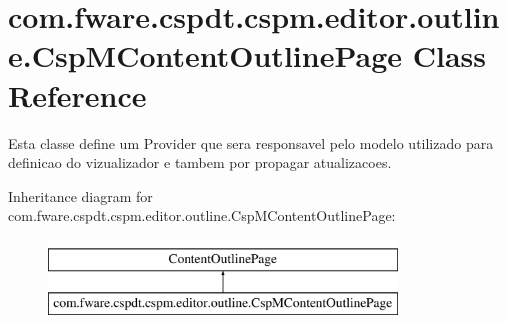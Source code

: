 \hypertarget{classcom_1_1fware_1_1cspdt_1_1cspm_1_1editor_1_1outline_1_1_csp_m_content_outline_page}{}\section{com.\+fware.\+cspdt.\+cspm.\+editor.\+outline.\+Csp\+M\+Content\+Outline\+Page Class Reference}
\label{classcom_1_1fware_1_1cspdt_1_1cspm_1_1editor_1_1outline_1_1_csp_m_content_outline_page}


Esta classe define um Provider que sera responsavel pelo modelo utilizado para definicao do vizualizador e tambem por propagar atualizacoes.  


Inheritance diagram for com.\+fware.\+cspdt.\+cspm.\+editor.\+outline.\+Csp\+M\+Content\+Outline\+Page\+:\begin{figure}[H]
\begin{center}
\leavevmode
\includegraphics[height=2.000000cm]{classcom_1_1fware_1_1cspdt_1_1cspm_1_1editor_1_1outline_1_1_csp_m_content_outline_page}
\end{center}
\end{figure}
